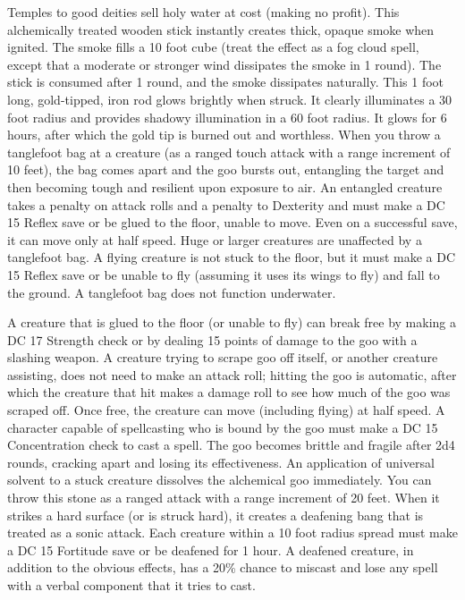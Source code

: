 \par Temples to good deities sell holy water at cost (making no profit).
 This alchemically treated wooden stick instantly creates thick, opaque smoke when ignited. The smoke fills a 10 foot cube (treat the effect as a fog cloud spell, except that a moderate or stronger wind dissipates the smoke in 1 round). The stick is consumed after 1 round, and the smoke dissipates naturally.
 This 1 foot long, gold-tipped, iron rod glows brightly when struck. It clearly illuminates a 30 foot radius and provides shadowy illumination in a 60 foot radius. It glows for 6 hours, after which the gold tip is burned out and worthless.
 When you throw a tanglefoot bag at a creature (as a ranged touch attack with a range increment of 10 feet), the bag comes apart and the goo bursts out, entangling the target and then becoming tough and resilient upon exposure to air. An entangled creature takes a  penalty on attack rolls and a  penalty to Dexterity and must make a DC 15 Reflex save or be glued to the floor, unable to move. Even on a successful save, it can move only at half speed. Huge or larger creatures are unaffected by a tanglefoot bag. A flying creature is not stuck to the floor, but it must make a DC 15 Reflex save or be unable to fly (assuming it uses its wings to fly) and fall to the ground. A tanglefoot bag does not function underwater.
\par A creature that is glued to the floor (or unable to fly) can break free by making a DC 17 Strength check or by dealing 15 points of damage to the goo with a slashing weapon. A creature trying to scrape goo off itself, or another creature assisting, does not need to make an attack roll; hitting the goo is automatic, after which the creature that hit makes a damage roll to see how much of the goo was scraped off. Once free, the creature can move (including flying) at half speed. A character capable of spellcasting who is bound by the goo must make a DC 15 Concentration check to cast a spell. The goo becomes brittle and fragile after 2d4 rounds, cracking apart and losing its effectiveness. An application of universal solvent to a stuck creature dissolves the alchemical goo immediately.
 You can throw this stone as a ranged attack with a range increment of 20 feet. When it strikes a hard surface (or is struck hard), it creates a deafening bang that is treated as a sonic attack. Each creature within a 10 foot radius spread must make a DC 15 Fortitude save or be deafened for 1 hour. A deafened creature, in addition to the obvious effects, has a 20\% chance to miscast and lose any spell with a verbal component that it tries to cast.
